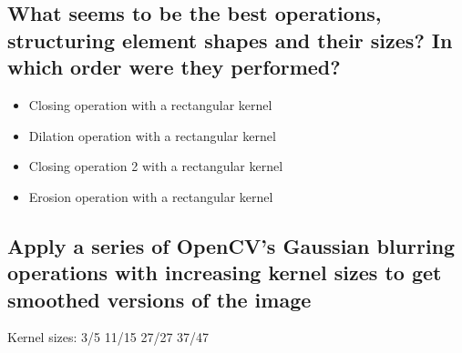 \documentclass{article}
\begin{document}
\subsection{What seems to be the best operations, structuring element shapes and their sizes? In which order were they performed?}

\begin{itemize}
    \item Closing operation with a rectangular kernel
    \item Dilation operation with a rectangular kernel
    \item Closing operation 2 with a rectangular kernel
    \item Erosion operation with a rectangular kernel
\end{itemize}

\subsection{Apply a series of OpenCV’s Gaussian blurring operations with increasing kernel sizes to get smoothed versions of the image}
Kernel sizes: 3/5 11/15 27/27 37/47
\end{document}
